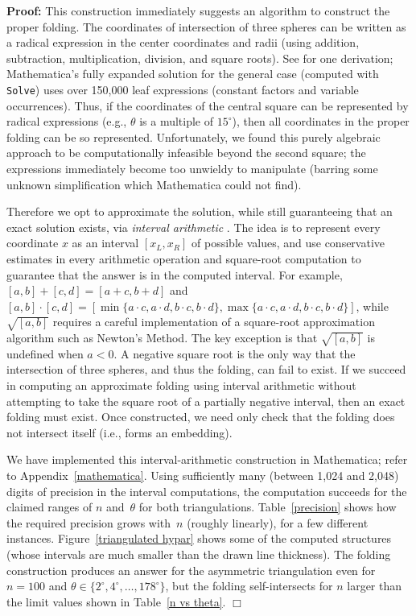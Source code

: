 \documentclass[11pt,letterpaper]{article}
\newenvironment{proof}{\noindent\textbf{Proof: }\ignorespaces}
  {\hspace*{\fill}$\Box$\medskip}
\begin{document}
\begin{proof}
  This construction immediately suggests an algorithm to construct the
  proper folding.  The coordinates of intersection of three spheres can be
  written as a radical expression in the center coordinates and radii
  (using addition, subtraction, multiplication, division, and square roots).
  See \cite{Trilateration-wiki} for one derivation;
  Mathematica's fully expanded solution for the general case
  (computed with \texttt{Solve}) uses over 150,000 leaf expressions
  (constant factors and variable occurrences).
  Thus, if the coordinates of the central square can be represented
  by radical expressions (e.g., $\theta$ is a multiple of $15^\circ$),
  then all coordinates in the proper folding can be so represented.
  Unfortunately, we found this purely algebraic approach to be
  computationally infeasible beyond the second square; the expressions
  immediately become too unwieldy to manipulate (barring some
  unknown simplification which Mathematica could not find).

  Therefore we opt to approximate the solution, while still guaranteeing
  that an exact solution exists, via \emph{interval arithmetic}
  \cite{Hayes-2003-interval,Moore-Kearfott-Cloud-2009,Alefeld-Herzberger-1983}.
  The idea is to represent every coordinate $x$ as an interval $[x_L,x_R]$
  of possible values, and use conservative estimates in every arithmetic
  operation and square-root computation to guarantee that the answer
  is in the computed interval.
  For example, $[a,b]+[c,d] = [a+c,b+d]$ and
  $[a,b] \cdot [c,d] = [\min\{a \cdot c, a \cdot d, b \cdot c, b \cdot d\},
  \max\{a \cdot c, a \cdot d, b \cdot c, b \cdot d\}]$,
  while $\sqrt{[a,b]}$ requires a careful implementation of a square-root
  approximation algorithm such as Newton's Method.
  The key exception is that $\sqrt{[a,b]}$ is undefined when $a < 0$.
  A negative square root is the only way that the intersection of three
  spheres, and thus the folding, can fail to exist.
  If we succeed in computing an approximate folding using interval
  arithmetic without attempting to take the square root of a partially
  negative interval, then an exact folding must exist.
  Once constructed, we need only check that the folding does not
  intersect itself (i.e., forms an embedding).

  We have implemented this interval-arithmetic construction in Mathematica;
  refer to Appendix~\ref{mathematica}.
  Using sufficiently many (between 1,024 and 2,048)
  digits of precision in the interval computations,
  the computation succeeds for the claimed ranges of $n$ and~$\theta$
  for both triangulations.
  Table~\ref{precision} shows how the required precision grows with~$n$
  (roughly linearly), for a few different instances.
  Figure~\ref{triangulated hypar} shows some of the computed structures
  (whose intervals are much smaller than the drawn line thickness).
  The folding construction produces an answer
  for the asymmetric triangulation even for $n=100$ and
  $\theta \in \{2^\circ, 4^\circ, \dots, 178^\circ\}$,
  but the folding self-intersects for $n$ larger
  than the limit values shown in Table~\ref{n vs theta}.
\end{proof}
\end{document}

